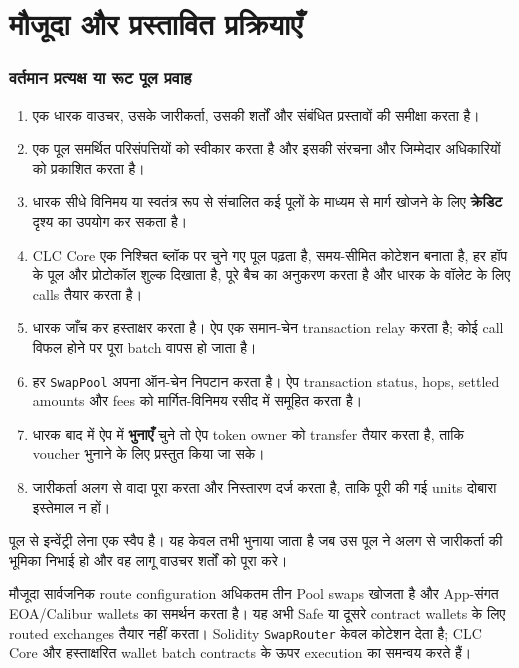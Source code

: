 \documentclass[11pt]{article}
\begin{document}
\section*{मौजूदा और प्रस्तावित प्रक्रियाएँ}

\subsubsection*{वर्तमान प्रत्यक्ष या रूट पूल प्रवाह}

\begin{enumerate}[leftmargin=*]
\item एक धारक वाउचर, उसके जारीकर्ता, उसकी शर्तों और संबंधित प्रस्तावों की समीक्षा करता है।
\item एक पूल समर्थित परिसंपत्तियों को स्वीकार करता है और इसकी संरचना और जिम्मेदार अधिकारियों को प्रकाशित करता है।
\item धारक सीधे विनिमय या स्वतंत्र रूप से संचालित कई पूलों के माध्यम से मार्ग खोजने के लिए \textbf{क्रेडिट} दृश्य का उपयोग कर सकता है।
\item CLC Core एक निश्चित ब्लॉक पर चुने गए पूल पढ़ता है, समय-सीमित कोटेशन बनाता है, हर हॉप के पूल और प्रोटोकॉल शुल्क दिखाता है, पूरे बैच का अनुकरण करता है और धारक के वॉलेट के लिए calls तैयार करता है।
\item धारक जाँच कर हस्ताक्षर करता है। ऐप एक समान-चेन transaction relay करता है; कोई call विफल होने पर पूरा batch वापस हो जाता है।
\item हर \texttt{SwapPool} अपना ऑन-चेन निपटान करता है। ऐप transaction status, hops, settled amounts और fees को मार्गित-विनिमय रसीद में समूहित करता है।
\item धारक बाद में ऐप में \textbf{भुनाएँ} चुने तो ऐप token owner को transfer तैयार करता है, ताकि voucher भुनाने के लिए प्रस्तुत किया जा सके।
\item जारीकर्ता अलग से वादा पूरा करता और निस्तारण दर्ज करता है, ताकि पूरी की गई units दोबारा इस्तेमाल न हों।
\end{enumerate}
पूल से इन्वेंट्री लेना एक स्वैप है। यह केवल तभी भुनाया जाता है जब उस पूल ने अलग से जारीकर्ता की भूमिका निभाई हो और वह लागू वाउचर शर्तों को पूरा करे।

मौजूदा सार्वजनिक route configuration अधिकतम तीन Pool swaps खोजता है और App-संगत EOA/Calibur wallets का समर्थन करता है। यह अभी Safe या दूसरे contract wallets के लिए routed exchanges तैयार नहीं करता। Solidity \texttt{SwapRouter} केवल कोटेशन देता है; CLC Core और हस्ताक्षरित wallet batch contracts के ऊपर execution का समन्वय करते हैं।
\end{document}
